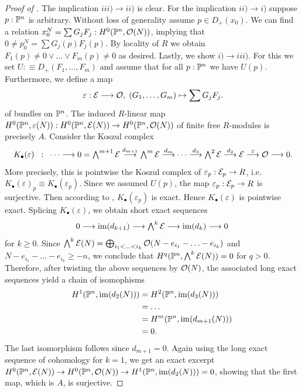 \begin{proof}[Proof of ]
  The implication $iii) \to ii)$ is clear.
  For the implication $ii) \to i)$ suppose $p : \mathbb{P}^n$ is arbitrary. Without loss of generality assume $p \in D_+(x_0)$.
  We can find a relation $x_0^N = \sum G_jF_j : H^0(\mathbb{P}^n,\mathcal{O}(N))$, implying that $0 \neq p_0^N = \sum G_j(p)F_j(p)$.
  By locality of $R$ we obtain $F_1(p) \neq 0\lor \hdots \lor F_m(p) \neq 0$ as desired.
  Lastly, we show $i) \to iii)$.
  For this we set $U :\equiv D_+(F_1,\hdots,F_m)$ and assume that for all $p:\mathbb{P}^n$ we have $U(p)$.
  Furthermore, we define a map
  \[
    \varepsilon : \mc E \longrightarrow \mc O, \;
    (G_1,\hdots,G_m) \mapsto \sum G_jF_j \rlap{.}
  \]
  of bundles on $\mathbb{P}^n$.
  The induced $R$-linear map $H^0(\mathbb{P}^n,\varepsilon(N)) : H^0(\mathbb{P}^n,\mathcal{E}(N)) \to H^0(\mathbb{P}^n,\mathcal{O}(N))$ of finite free $R$-modules is precisely $A$.
  Consider the Koszul complex
  \[
    \textstyle
    K_\bullet(\varepsilon) \;\;:\;\;
    \cdots \longrightarrow
    0 = \bigwedge^{m+1}\mc E \overset{d_{m+1}}{\longrightarrow}
    \bigwedge^m\mc E         \overset{d_m}{\longrightarrow}
    \cdots                   \overset{d_3}{\longrightarrow}
    \bigwedge^2 \mc E        \overset{d_2}{\longrightarrow}
    \mc E                    \overset{\varepsilon}{\longrightarrow}
    \mc O                    \longrightarrow 0 \rlap{.}
  \]
  More precisely, this is pointwise the Koszul complex of $\varepsilon_p : \mathcal{E}_p \to R$, i.e.\ $K_\bullet(\varepsilon)_p \equiv K_\bullet(\varepsilon_p)$.
  Since we assumed $U(p)$, the map $\varepsilon_p : \mathcal{E}_p \to R$ is surjective.
  Then according to , $K_\bullet(\varepsilon_p)$ is exact.
  Hence $K_\bullet(\varepsilon)$ is pointwise exact.
  Splicing $K_\bullet(\varepsilon)$, we obtain short exact sequences
  \[
    \textstyle
    0 \longrightarrow \operatorname{im}(d_{k+1}) \longrightarrow \bigwedge^k\mathcal{E} \longrightarrow \operatorname{im}(d_k) \longrightarrow 0
  \]
  for $k \geq 0$.
  Since $\bigwedge^k\mathcal{E}(N) = \bigoplus_{i_1 < \hdots < i_k} \mathcal{O}(N-e_{i_1} - \hdots - e_{i_k})$ and $N - e_{i_1} - \hdots - e_{i_k} \geq -n$, we conclude that $H^q(\mathbb{P}^n,\bigwedge^k\mathcal{E}(N))=0$ for $q > 0$.
  Therefore, after twisting the above sequences by $\mathcal{O}(N)$, the associated long exact sequences yield a chain of isomophisms
  \begin{align*}
    H^1(\bP^n,\im(d_2(N))) &= H^2(\bP^n,\im(d_3(N))) \\
                           &= \hdots \\
                           &= H^m(\bP^n,\im(d_{m+1}(N))) \\
                           &= 0 \rlap{.}
  \end{align*}
  The last isomorphism follows since $d_{m+1}=0$.
  Again using the long exact sequence of cohomology for $k=1$, we get an exact excerpt $H^0(\mathbb{P}^n,\mathcal{E}(N)) \to H^0(\mathbb{P}^n, \mathcal{O}(N)) \to H^1(\mathbb{P}^n,\operatorname{im}(d_2(N)))=0$, showing that the first map, which is $A$, is surjective.
\end{proof}

